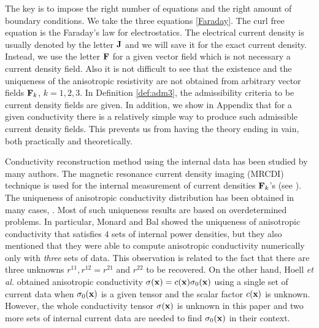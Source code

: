 \documentclass[11pt]{amsart}
\theoremstyle{plain}
\theoremstyle{remark}
\numberwithin{equation}{section}
\numberwithin{Thm}{section}
\def\J{{\bf J}}
\def\F{{\bf F}}
\def\x{{\bf x}}
\begin{document}
The key is to impose the right number of equations and the right amount of boundary conditions. We take the three equations \eqref{Faraday}. The curl free equation is the Faraday's law for electrostatics. The electrical current density is usually denoted by the letter $\J$ and we will save it for the exact current density. Instead, we use the letter $\F$ for a given vector field which is not necessary a current density field. Also it is not difficult to see that the existence and the uniqueness of the anisotropic resistivity are not obtained from arbitrary vector fields $\F_k$, $k=1,2,3$. In Definition \ref{def:adm3}, the admissibility criteria to be current density fields are given. In addition, we show in Appendix that for a given conductivity there is a relatively simple way to produce such admissible current density fields. This prevents us from having the theory ending in vain, both practically and theoretically. %

Conductivity reconstruction method using the internal data has been studied by many authors. The magnetic resonance current density imaging (MRCDI) technique is used for the internal measurement of current densities $\F_k$'s (see \cite{Gamba,Joy,Scott}). %
The uniqueness of anisotropic conductivity distribution has been obtained in many cases, \cite{bal_inverse_2011, doi:10.1137/140961754, bal_inverse_2014,MR3206987, monard_inverse_2012-1,monard_inverse_2012,doi:10.1080/03605302.2013.787089}. Most of such uniqueness results are based on overdetermined problems. In particular, Monard and Bal \cite{monard_inverse_2012-1} showed the uniqueness of anisotropic conductivity that satisfies $4$ sets of internal power densities, but they also mentioned that they were able to compute anisotropic conductivity numerically only with \emph{three} sets of data. This observation is related to the fact that there are three unknowns $r^{11},r^{12}=r^{21}$ and $r^{22}$ to be recovered. On the other hand, Hoell \emph{et al.} \cite{MR3206987} obtained anisotropic conductivity $\sigma(\x)=c(\x)\sigma_0(\x)$ using a single set of current data when $\sigma_0(\x)$ is a given tensor and the scalar factor $c(\x)$ is unknown. However, the whole conductivity tensor $\sigma(\x)$ is unknown in this paper and two more sets of internal current data are needed to find $\sigma_0(\x)$ in their context.
\end{document}
